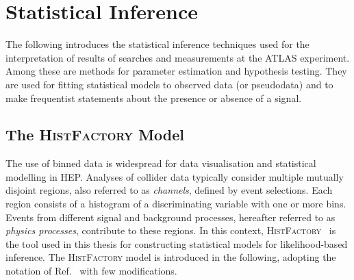 \section{Statistical Inference}%
\label{sec:statistical_inference}

The following introduces the statistical inference techniques used for the
interpretation of results of searches and measurements at the ATLAS experiment.
Among these are methods for parameter estimation and hypothesis testing. They
are used for fitting statistical models to observed data (or pseudodata) and to
make frequentist statements about the presence or absence of a signal.


\subsection{The \textsc{HistFactory} Model}%
\label{sec:histfactory}

The use of binned data
is widespread for data visualisation and statistical modelling in HEP. Analyses
of collider data typically consider multiple mutually disjoint regions, also
referred to as \emph{channels}, defined by event selections. Each region
consists of a histogram of a discriminating variable with one or more
bins. Events from different signal and background processes, hereafter referred
to as \emph{physics processes}, contribute to these regions. In this context,
\textsc{HistFactory}~\cite{cranmer2012} is the tool used in this thesis for
constructing statistical models for likelihood-based inference. The
\textsc{HistFactory} model is introduced in the following, adopting the notation
of Ref.~\cite{cranmer2012} with few modifications.

